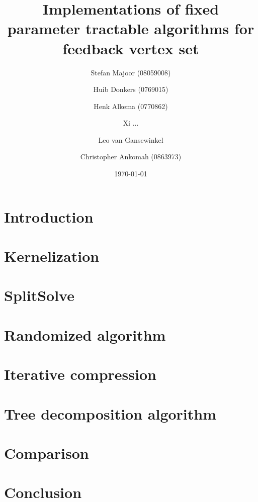\documentclass[a4paper,10pt]{article}
\title{Implementations of fixed parameter tractable algorithms for feedback vertex set}
\author{
	Stefan Majoor (08059008)
	\and
	Huib Donkers (0769015)
	\and
	Henk Alkema (0770862)
	\and
	Xi ...
	\and
	Leo van Gansewinkel
	\and
	Christopher Ankomah (0863973)
}
\date{\today}
\begin{document}
\maketitle
\setcounter{tocdepth}{2}
\tableofcontents
\clearpage

\begin{abstract}

\end{abstract}

\section{Introduction} \label{sec:intro}


\section{Kernelization} \label{sec:kern}


\section{SplitSolve} \label{sec:splitsolve}


\section{Randomized algorithm} \label{sec:rand}


\section{Iterative compression} \label{sec:itcomp}


\section{Tree decomposition algorithm} \label{sec:treewidth}


\section{Comparison} \label{sec:comparison}


\section{Conclusion} \label{sec:conclusion}
\end{document}
